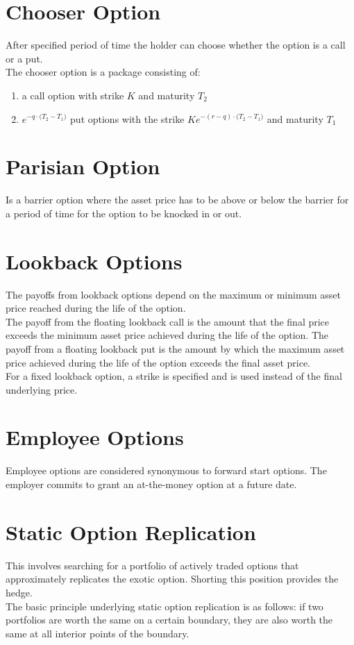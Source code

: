 \section{Chooser Option}
After specified period of time the holder can choose whether the option is a call or a put.\\
The chooser option is a package consisting of:
\begin{enumerate}
	\item a call option with strike $K$ and maturity $T_{2}$
	\item $e^{-q\cdot\big(T_{2} - T_{1}\big)}$ put options with the strike $Ke^{-(r - q)\cdot\big(T_{2} - T_{1}\big)}$ and maturity $T_{1}$
\end{enumerate}

\section{Parisian Option}
Is a barrier option where the asset price has to be above or below the barrier for a period of time for the option to be knocked in or out.

\section{Lookback Options}
The payoffs from lookback options depend on the maximum or minimum asset price reached during the life of the option.\\
The payoff from the floating lookback call is the amount that the final price exceeds the minimum asset price achieved during the life of the option. The payoff from a floating lookback put is the amount by which the maximum asset price achieved during the life of the option exceeds the final asset price.\\
For a fixed lookback option, a strike is specified and is used instead of the final underlying price.

\section{Employee Options}
Employee options are considered synonymous to forward start options. The employer commits to grant an at-the-money option at a future date.

\section{Static Option Replication}
This involves searching for a portfolio of actively traded options that approximately replicates the exotic option. Shorting this position provides the hedge.\\
The basic principle underlying static option replication is as follows: if two portfolios are worth the same on a certain boundary, they are also worth the same at all interior points of the boundary.